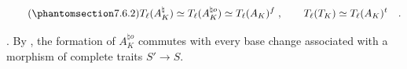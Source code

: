 \begin{equation}\tag{\SGARefTarget{sga7.sga7i.eix.n7-6-2}{7.6.2}}
T_{\ell}(A_K^{\natural}) \simeq T_{\ell}(A_K^{\natural o})
 \simeq T_{\ell}(A_K)^f \; , \qquad
T_{\ell}(T_K) \simeq T_{\ell}(A_K)^t \quad .
\end{equation}

\medskip
\noindent
{}. By , the formation of $A_K^{\natural o}$ commutes with
every base change associated with a morphism of complete traits
$S'\longrightarrow S$.
